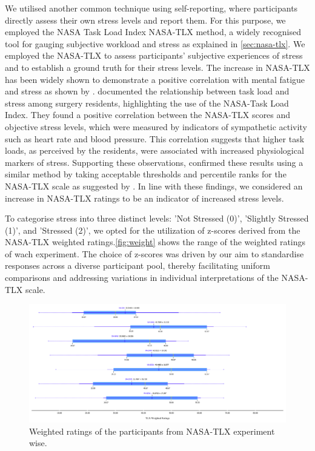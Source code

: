We utilised another common technique using self-reporting, where participants directly assess their own stress levels and report them. For this purpose, we employed the NASA Task Load Index \gls{NASA-TLX} method, a widely recognised tool for gauging subjective workload and stress as explained in \autoref{sec:nasa-tlx}. We employed the \gls{NASA-TLX} to assess participants' subjective experiences of stress and to establish a ground truth for their stress levels.
The increase in \gls{NASA-TLX} has been widely shown to demonstrate a positive correlation with mental fatigue and stress as shown by \parencites{tlxstress}{Kaduk2020}. \textcite{Bakhsh2019-kr} documented the relationship between task load and stress among surgery residents, highlighting the use of the NASA-Task Load Index. They found a positive correlation between the NASA-TLX scores and objective stress levels, which were measured by indicators of sympathetic activity such as heart rate and blood pressure. This correlation suggests that higher task loads, as perceived by the residents, were associated with increased physiological markers of stress. Supporting these observations, \textcite{Favre-Felix2022-ln} confirmed these results using a similar method by taking acceptable thresholds and percentile ranks for the NASA-TLX scale as suggested by \textcite{Grier2015-uq}. In line with these findings, we considered an increase in \gls{NASA-TLX} ratings to be an indicator of increased stress levels.

To categorise stress into three distinct levels: 'Not Stressed (0)', 'Slightly Stressed (1)', and 'Stressed (2)', we opted for the utilization of z-scores derived from the NASA-TLX weighted ratings.\autoref{fig:weight} shows the range of the weighted ratings of wach experiment. The choice of z-scores was driven by our aim to standardise responses across a diverse participant pool, thereby facilitating uniform comparisons and addressing variations in individual interpretations of the NASA-TLX scale.

\begin{figure}[!htbp]
	\centering
	\includegraphics[width=\columnwidth]{images/tlx.pdf}
	\caption{Weighted ratings of the participants from NASA-TLX experiment wise.}
	\label{fig:weight}
\end{figure}

